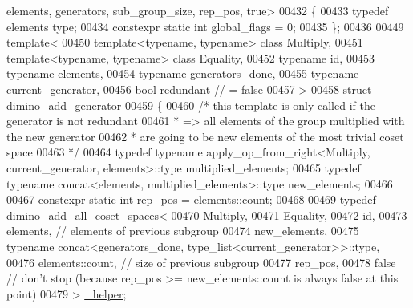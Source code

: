 \begin{DoxyCode}
      elements, generators, sub\_group\_size, rep\_pos, true>
00432 \{
00433   \textcolor{keyword}{typedef} elements type;
00434   constexpr \textcolor{keyword}{static} \textcolor{keywordtype}{int} global\_flags = 0;
00435 \};
00436 
00449 \textcolor{keyword}{template}<
00450   \textcolor{keyword}{template}<\textcolor{keyword}{typename}, \textcolor{keyword}{typename}> \textcolor{keyword}{class }Multiply,
00451   \textcolor{keyword}{template}<\textcolor{keyword}{typename}, \textcolor{keyword}{typename}> \textcolor{keyword}{class }Equality,
00452   \textcolor{keyword}{typename} id,
00453   \textcolor{keyword}{typename} elements,
00454   \textcolor{keyword}{typename} generators\_done,
00455   \textcolor{keyword}{typename} current\_generator,
00456   \textcolor{keywordtype}{bool} redundant          \textcolor{comment}{// = false}
00457 >
\hyperlink{struct_eigen_1_1internal_1_1group__theory_1_1dimino__add__generator}{00458} \textcolor{keyword}{struct }\hyperlink{struct_eigen_1_1internal_1_1group__theory_1_1dimino__add__generator}{dimino\_add\_generator}
00459 \{
00460   \textcolor{comment}{/* this template is only called if the generator is not redundant}
00461 \textcolor{comment}{   * => all elements of the group multiplied with the new generator}
00462 \textcolor{comment}{   *    are going to be new elements of the most trivial coset space}
00463 \textcolor{comment}{   */}
00464   \textcolor{keyword}{typedef} \textcolor{keyword}{typename} apply\_op\_from\_right<Multiply, current\_generator, elements>::type multiplied\_elements;
00465   \textcolor{keyword}{typedef} \textcolor{keyword}{typename} concat<elements, multiplied\_elements>::type new\_elements;
00466 
00467   constexpr \textcolor{keyword}{static} \textcolor{keywordtype}{int} rep\_pos = elements::count;
00468 
00469   \textcolor{keyword}{typedef} \hyperlink{struct_eigen_1_1internal_1_1group__theory_1_1dimino__add__all__coset__spaces}{dimino\_add\_all\_coset\_spaces}<
00470     Multiply,
00471     Equality,
00472     id,
00473     elements, \textcolor{comment}{// elements of previous subgroup}
00474     new\_elements,
00475     \textcolor{keyword}{typename} concat<generators\_done, type\_list<current\_generator>>::type,
00476     elements::count, \textcolor{comment}{// size of previous subgroup}
00477     rep\_pos,
00478     \textcolor{keyword}{false} \textcolor{comment}{// don't stop (because rep\_pos >= new\_elements::count is always false at this point)}
00479   > \hyperlink{struct_eigen_1_1internal_1_1group__theory_1_1dimino__add__all__coset__spaces}{\_helper};

\end{DoxyCode}
